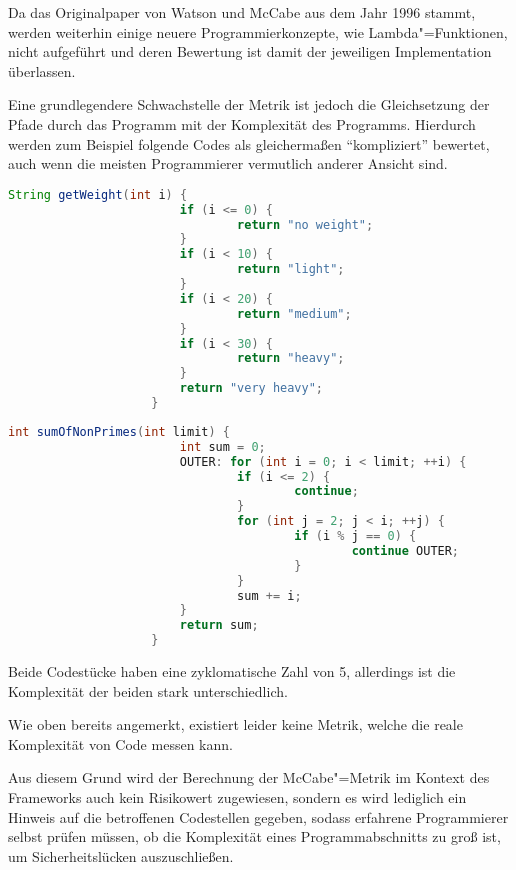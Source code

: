                 Da das Originalpaper von Watson und
                McCabe aus dem Jahr 1996 stammt,
                werden weiterhin einige neuere Programmierkonzepte,
                wie Lambda"=Funktionen,
                nicht aufgeführt und
                deren Bewertung ist damit der jeweiligen Implementation überlassen.\cite{Hummel2014}

                Eine grundlegendere Schwachstelle der Metrik ist jedoch die Gleichsetzung der Pfade durch das Programm mit der Komplexität des Programms.
                Hierdurch werden zum Beispiel folgende Codes als gleichermaßen
                \enquote{kompliziert} bewertet,
                auch wenn die meisten Programmierer vermutlich anderer Ansicht sind.\cite{Hummel2014}

                \begin{lstlisting}[caption={Eine einfache Gewichtsfunktion}, gobble=20, language=java]
                    String getWeight(int i) {
                        if (i <= 0) {
                                return "no weight";
                        }
                        if (i < 10) {
                                return "light";
                        }
                        if (i < 20) {
                                return "medium";
                        }
                        if (i < 30) {
                                return "heavy";
                        }
                        return "very heavy";
                    }
                \end{lstlisting}

                \begin{lstlisting}[caption={Die Summe aller Primzahlen}, gobble=20, language=java]
                    int sumOfNonPrimes(int limit) {
                        int sum = 0;
                        OUTER: for (int i = 0; i < limit; ++i) {
                                if (i <= 2) {
                                        continue;
                                }
                                for (int j = 2; j < i; ++j) {
                                        if (i % j == 0) {
                                                continue OUTER;
                                        }
                                }
                                sum += i;
                        }
                        return sum;
                    }
                \end{lstlisting}

                Beide Codestücke haben eine zyklomatische Zahl von 5,
                allerdings ist die Komplexität der beiden stark unterschiedlich.

                Wie oben bereits angemerkt,
                existiert leider keine Metrik,
                welche die reale Komplexität von Code messen kann.

                Aus diesem Grund wird der Berechnung der McCabe"=Metrik im Kontext des Frameworks auch kein Risikowert zugewiesen,
                sondern es wird lediglich ein Hinweis auf die betroffenen Codestellen gegeben,
                sodass erfahrene Programmierer selbst prüfen müssen,
                ob die Komplexität eines Programmabschnitts zu groß ist,
                um Sicherheitslücken auszuschließen.
